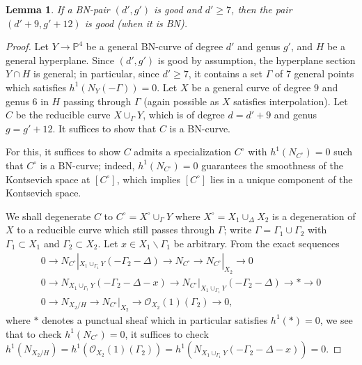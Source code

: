 \documentclass[11pt]{amsart}
\newcommand{\pp}{\mathbb{P}}
\renewcommand{\O}{\mathcal{O}}
\newtheorem{lem}[thm]{Lemma}
\theoremstyle{definition}
\theoremstyle{remark}
\begin{document}
\begin{lem}\label{dplus9}
If a BN-pair $(d',g')$ is good and $d' \geq 7$, then the pair $(d' + 9, g' + 12)$ is good (when it is BN).
\end{lem}
\begin{proof}
Let $Y \to \pp^4$ be a general BN-curve of degree $d'$ and genus $g'$,
and $H$ be a general hyperplane.
Since $(d', g')$ is good by assumption,
the hyperplane section $Y \cap H$ is general;
in particular, since $d' \geq 7$,
it contains a set $\Gamma$ of $7$ general points
which satisfies $h^1(N_Y(-\Gamma)) = 0$.
Let $X$ be a general curve of degree $9$ and genus $6$ in $H$ passing through $\Gamma$ (again possible as $X$ satisfies interpolation).  Let $C$ be the reducible curve $X \cup_\Gamma Y$, which is of degree $d= d' + 9$ and genus $g = g' + 12$.  %
It suffices to show that $C$ is a BN-curve.

For this, it suffices to show $C$ admits a specialization $C^\circ$
with $h^1(N_{C^\circ}) = 0$ such that $C^\circ$ is a BN-curve;
indeed, $h^1(N_{C^\circ}) = 0$ guarantees the smoothness of the Kontsevich
space at $[C^\circ]$, which implies $[C^\circ]$
lies in a unique component of the Kontsevich space.

We shall degenerate $C$ to $C^\circ = X^\circ \cup_\Gamma Y$
where $X^\circ = X_1 \cup_\Delta X_2$ is a degeneration of $X$
to a reducible curve
which still passes through $\Gamma$;
write $\Gamma = \Gamma_1 \cup \Gamma_2$
with $\Gamma_1 \subset X_1$ and $\Gamma_2 \subset X_2$.
Let $x \in X_1 \smallsetminus \Gamma_1$ be arbitrary.
From the exact sequences
\begin{gather*}
0 \to N_{C^\circ}|_{X_1 \cup_{\Gamma_1} Y} (-\Gamma_2 - \Delta) \to N_{C^\circ} \to N_{C^\circ}|_{X_2} \to 0 \\
0 \to N_{X_1 \cup_{\Gamma_1} Y} (-\Gamma_2 - \Delta - x) \to N_{C^\circ}|_{X_1 \cup_{\Gamma_1} Y} (-\Gamma_2 - \Delta) \to * \to 0 \\
0 \to N_{X_2 / H} \to N_{C^\circ}|_{X_2} \to \O_{X_2}(1)(\Gamma_2) \to 0,
\end{gather*}
where $*$ denotes a punctual sheaf which in particular satisfies $h^1(*) = 0$,
we see that to check $h^1(N_{C^\circ}) = 0$,
it suffices to check $h^1(N_{X_2 / H}) = h^1(\O_{X_2}(1)(\Gamma_2)) = h^1(N_{X_1 \cup_{\Gamma_1} Y} (-\Gamma_2 - \Delta - x)) = 0$.


\end{proof}
\end{document}
